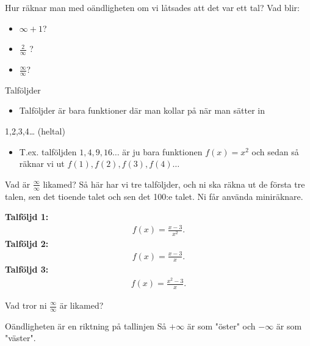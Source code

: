 \documentclass{beamer}
\begin{document}
\begin{frame}{Hur räknar man med oändligheten om vi låtsades att det var ett tal?}
Vad blir:
\begin{itemize}
\item \(\infty + 1\)?
\item \(\frac{2}{\infty}\) ?
\item \(\frac{\infty}{\infty }\)?
\end{itemize}
\end{frame}


\begin{frame}{Talföljder}
\begin{itemize}
\item Talföljder är bara funktioner där man kollar på när man sätter in
\end{itemize}
1,2,3,4\ldots{} (heltal)
\begin{itemize}
\item T.ex. talföljden \(1,4,9,16 \dots\) är ju bara funktionen \(f(x) = x^2\) och sedan
så räknar vi ut \(f(1), f(2), f(3), f(4) \dots\)
\end{itemize}
\end{frame}


\begin{frame}{Vad är \( \frac{\infty}{\infty } \) likamed?}
Så här har vi tre talföljder, och ni ska räkna ut de första tre talen, sen
det tioende talet och sen det 100:e talet. Ni får använda miniräknare.

\textbf{Talföljd 1:} \begin{align*}
f (x) = \frac{x - 3}{x^2}
.
\end{align*}
\textbf{Talföljd 2:} \begin{align*}
f(x) = \frac{x-3}{x}
.
\end{align*}
\textbf{Talföljd 3:} \begin{align*}
f(x) = \frac{x^2 - 3}{x}
.
\end{align*}

Vad tror ni \(\frac{\infty}{\infty }\) är likamed?
\end{frame}

\begin{frame}{Oändligheten är en riktning på tallinjen}
Så \(+\infty\) är som "öster" och \(-\infty\) är som "väster".
\end{frame}
\end{document}
